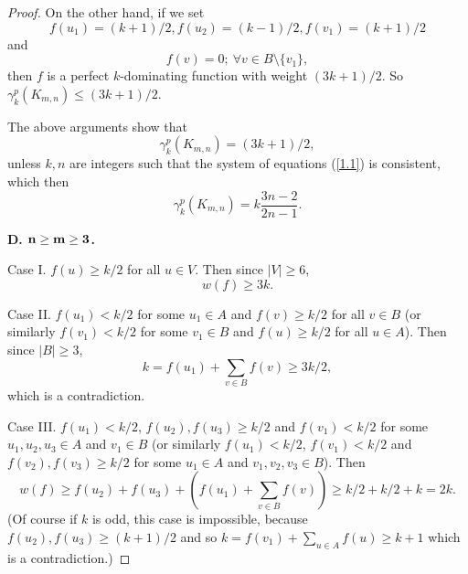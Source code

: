 \documentclass[12pt]{amsart}
\begin{document}
\begin{proof}
On the other hand, if we set 
$$f(u_1)=(k+1)/2, f(u_2)=(k-1)/2, f(v_1)=(k+1)/2$$
and
$$f(v)=0; \ \forall v\in B\setminus\{v_1\},$$
then $f$ is a perfect $k$-dominating function with weight $(3k+1)/2$. So $\gamma_k^p(K_{m,n})\leq (3k+1)/2$. 

The above arguments show that 
$$\gamma_k^p(K_{m,n})=(3k+1)/2,$$
 unless $k, n$ are integers such that the system of equations (\ref{1.1}) is consistent, which then $$\gamma_k^p(K_{m,n})=k\frac{3n-2}{2n-1}.$$

\textbf{D. ${\bf n\geq m \geq 3}$.} 

Case I. $f(u)\geq k/2$ for all $u\in V$. Then since $|V|\geq 6$, 
$$w(f)\geq 3k.$$

Case II. $f(u_1)<k/2$ for some $u_1\in A$ and $f(v)\geq k/2$ for all $v\in B$ (or similarly $f(v_1)<k/2$ for some $v_1\in B$ and $f(u)\geq k/2$ for all $u\in A$). Then since $|B|\geq 3$, 
$$k=f(u_1)+\sum_{v\in B}f(v)\geq 3k/2,$$
which is a contradiction.

Case III. $f(u_1)<k/2$, $f(u_2), f(u_3)\geq k/2$ and $f(v_1)<k/2$ for some $u_1, u_2, u_3\in A$ and $v_1\in B$ (or similarly $f(u_1)<k/2$, $f(v_1)<k/2$ and $f(v_2), f(v_3)\geq k/2$ for some $u_1\in A$ and $v_1, v_2, v_3\in B$). Then 
$$w(f)\geq f(u_2)+f(u_3)+(f(u_1)+\sum_{v\in B}f(v))\geq k/2+k/2+k=2k.$$
(Of course if $k$ is odd, this case is impossible, because $f(u_2), f(u_3)\geq (k+1)/2$ and so $k=f(v_1)+\sum_{u\in A}f(u)\geq k+1$ which is a contradiction.)


\end{proof}
\end{document}
